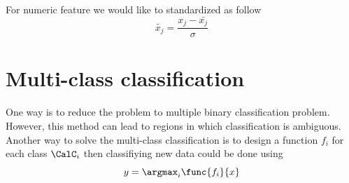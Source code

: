 For numeric feature we would like to standardized as follow
\begin{equation*}
    \tilde{x_j}  = \dfrac{x_j - \bar{x_j}}{\sigma}
\end{equation*}

\section{Multi-class classification}
One way is to reduce the problem to multiple binary classification problem. However, this method can lead to regions in which classification is ambiguous.
Another way to solve the multi-class classification is to design a function \(f_i\) for each class \(\CalC_i\) then classifiying new data could be done using 
\begin{equation*}
    y = \argmax_i \func{f_i}{x}
\end{equation*}